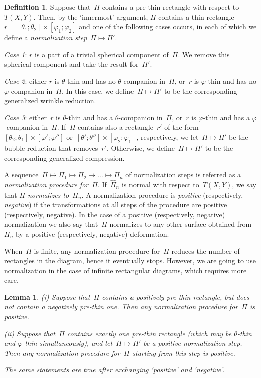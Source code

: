 \documentclass{amsart}
\theoremstyle{theorem}
\newtheorem{lemm}[theo]{Lemma}
\theoremstyle{remark}
\theoremstyle{definition}
\newtheorem{defi}[theo]{Definition}
\numberwithin{equation}{section}
\numberwithin{figure}{section}
\begin{document}
\begin{defi}\label{normalize-def}
Suppose that~$\Pi$ contains a pre-thin rectangle
with respect to~$T(X,Y)$. Then, by the `innermost' argument, $\Pi$ contains a thin
rectangle~$r=[\theta_1;\theta_2]\times[\varphi_1;\varphi_2]$ and one of the following cases occurs,
in each of which we define a \emph{normalization step}~$\Pi\mapsto\Pi'$.

\smallskip\noindent\emph{Case 1}: $r$ is a part of a trivial spherical component of~$\Pi$. We remove 
this spherical component and take the result for~$\Pi'$.

\smallskip\noindent\emph{Case 2}: either $r$ is $\theta$-thin and has no $\theta$-companion in~$\Pi$,
or~$r$ is $\varphi$-thin and has no $\varphi$-companion in~$\Pi$. In this case, we define~$\Pi\mapsto\Pi'$
to be the corresponding generalized wrinkle reduction.

\smallskip\noindent\emph{Case 3}: either~$r$ is $\theta$-thin and has a $\theta$-companion in~$\Pi$,
or~$r$ is $\varphi$-thin and has a $\varphi$-companion in~$\Pi$. If~$\Pi$ contains also
a rectangle~$r'$ of the form~$[\theta_2;\theta_1]\times[\varphi';\varphi'']$ or~$[\theta';\theta'']\times[\varphi_2;\varphi_1]$,
respectively, we let~$\Pi\mapsto\Pi'$ be the bubble reduction that removes~$r'$. Otherwise, 
we define~$\Pi\mapsto\Pi'$
to be the corresponding generalized compression.

\smallskip
A sequence~$\Pi\mapsto\Pi_1\mapsto\Pi_2\mapsto\ldots\mapsto\Pi_n$
of normalization steps is referred as a \emph{normalization procedure for~$\Pi$}. If~$\widehat\Pi_n$
is normal with respect to~$T(X,Y)$, we say that \emph{$\Pi$ normalizes to~$\Pi_n$}.
A normalization procedure is \emph{positive} (respectively, \emph{negative}) if the transformations
at all steps of the procedure are positive (respectively, negative).
In the case of
a positive (respectively, negative)
normalization we also say that~$\Pi$ normalizes to any other surface obtained from~$\Pi_n$ by a
positive (respectively, negative) deformation.\end{defi}

When~$\Pi$ is finite, any normalization procedure for~$\Pi$ reduces the number of rectangles
in the diagram, hence it eventually stops. However, we are going to use normalization
in the case of infinite rectangular diagrams, which requires more care.

\begin{lemm}\label{only-positive-lem}\emph{(i)}
Suppose that~$\Pi$ contains a positively pre-thin rectangle, but does not contain a negatively pre-thin one. Then any normalization procedure for~$\Pi$ is positive.

\emph{(ii)}
Suppose that~$\Pi$ contains exactly one pre-thin rectangle \emph(which may be $\theta$-thin
and $\varphi$-thin simultaneously\emph), and let~$\Pi\mapsto\Pi'$
be a positive normalization step. Then any normalization procedure for~$\Pi$
starting from this step is positive.

The same statements are true after exchanging `positive' and `negative'.
\end{lemm}
\end{document}
